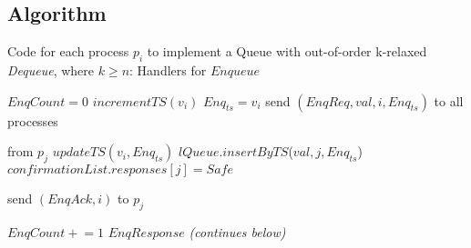 \documentclass[a4paper,USenglish]{lipics-v2021} %
\newcommand{\red}[1]{\textcolor{red}{#1}} %
\newcommand{\pluseq}{\mathrel{+}=}
\begin{document}
\subsection{Algorithm}

\begin{algorithm}
  \caption{Code for each process $p_i$ to implement a Queue with out-of-order k-relaxed \textit{Dequeue}, where $k \geq n$: Handlers for $Enqueue$}\label{alg:relaxed}
  \begin{algorithmic}[1]
    \Statex \Comment{\red{Is this entirely the same as for unrelaxed queues? I know I said to keep it, but I'm second-guessing whether we should include it if it's in a separate algorithm block and completely unchanged.}
}
      \State $EnqCount = 0$
      \State $incrementTS(v_i)$
      \State $Enq_{ts} = v_i$
      \State send $(EnqReq, val, i, Enq_{ts})$ to all processes
    \EndFunction

     from $p_j$
      \State $updateTS(v_i, Enq_{ts})$
      \State $lQueue.insertByTS$($val, j, Enq_{ts}$)
          \State $confirmationList.responses[j] = Safe$
        \EndIf
      \EndFor

      \State send $(EnqAck, i)$ to $p_j$
    \EndFunction

      \State $EnqCount \pluseq 1$
        \Return $EnqResponse$
      \EndIf
    \EndFunction
    \Statex
    \Statex \emph{(continues below)}
  \end{algorithmic}
\end{algorithm}
\end{document}

